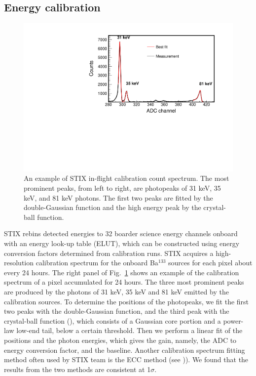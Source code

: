 \documentclass[referee]{aa} %
\begin{document}
\subsection{Energy calibration}
\begin{figure}
 \centering
  \includegraphics[width=0.8\linewidth]{figures/cal-fit.pdf}
  \caption{An example of STIX in-flight calibration count spectrum.
  The most prominent peaks, from left to right, are photopeaks of 31 keV, 35 keV, and 81 keV
  photons. The first two peaks are fitted by the double-Gaussian function and the high energy peak by  
  the crystal-ball function. }
    \label{fig:cal-fit}
\end{figure}
STIX rebins detected energies to 32 boarder science energy channels onboard
with an energy look-up table (ELUT), which can be constructed using energy conversion
factors determined from calibration runs. 
STIX acquires a high-resolution calibration spectrum
for the onboard Ba$^{133}$ sources for each pixel about every 24 hours. 
The right panel of Fig.~\ref{fig:cal-fit} shows an example of the calibration spectrum of a pixel accumulated for 24 hours.  
The three most prominent peaks are produced by the photons of  31 keV, 35 keV and 81 keV emitted by the calibration sources. 
To determine the positions of the photopeaks, we fit the first two peaks with the double-Gaussian function,  and the third peak
with the crystal-ball function (\cite{crsystallball}),  which consists of a Gaussian core portion 
and a power-law low-end tail, below a certain threshold.
Then we perform a linear fit of the positions and the photon energies, 
which gives the gain, namely, the ADC to energy conversion factor, and the baseline. 
Another calibration spectrum fitting method often used by STIX team  
 is the ECC method (see \cite{ecc,ecc2})).  We found that the results from the two methods are consistent at 1$\sigma$.
\end{document}
